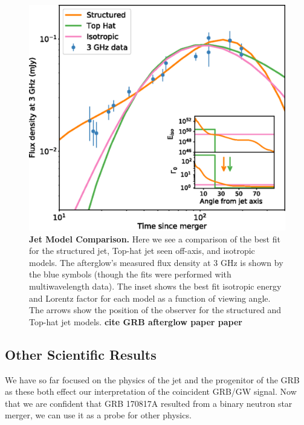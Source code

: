 \documentclass[11pt]{cuthesis}
\begin{document}
\begin{figure} %
\begin{center}
\includegraphics[width=1.0\linewidth]{grb_model_comparison.png}
\end{center}
\caption{\textbf{Jet Model Comparison.} Here we see a comparison of the best fit for the structured jet, Top-hat jet seen off-axis, and isotropic models. The afterglow's measured flux density at 3 GHz is shown by the blue symbols (though the fits were performed with multiwavelength data). The inset shows the best fit isotropic energy and Lorentz factor for each model as a function of viewing angle. The arrows show the position of the observer for the structured and Top-hat jet models. \textbf{cite GRB afterglow paper paper} }
\label{fig:model comparison}
\end{figure}

\subsection{Other Scientific Results}
We have so far focused on the physics of the jet and the progenitor of the GRB as these both effect our interpretation of the coincident GRB/GW signal. Now that we are confident that GRB 170817A resulted from a binary neutron star merger, we can use it as a probe for other physics. 
\end{document}
